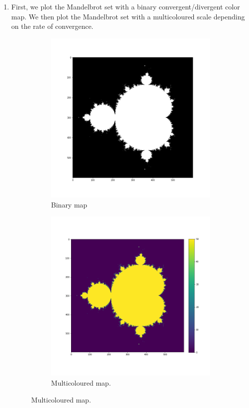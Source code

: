 \documentclass{article}
\begin{document}
\begin{enumerate}
\item First, we plot the Mandelbrot set with a binary convergent/divergent color map. We then plot the Mandelbrot set with a multicoloured scale depending on the rate of convergence.
\begin{figure}[htb!]
\begin{subfigure}{.5\textwidth}
  \centering
  \includegraphics[width=.8\linewidth]{mandelbrot_binary.png}
  \caption{Binary map}
  \label{fig:sfig1}
\end{subfigure}%
\begin{subfigure}{.5\textwidth}
  \centering
  \includegraphics[width=.8\linewidth]{mandelbrot_multi.png}
  \caption{Multicoloured map.}
  \label{fig:sfig2}
\end{subfigure}
\label{fig:fig}
\end{figure}


\end{enumerate}
\end{document}
